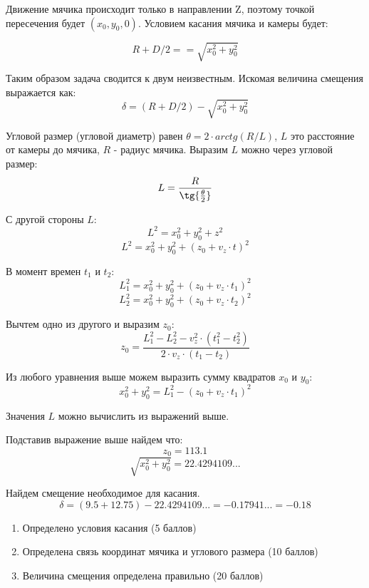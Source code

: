 \solutionSection
Движение мячика происходит только в направлении Z, поэтому точкой пересечения будет $(x_0, y_0, 0)$.  Условием касания мячика и камеры будет:

\[R + D/2 == \sqrt{x_0^2 + y_0^2} \]

Таким образом задача сводится к двум неизвестным. Искомая величина смещения выражается как:
\[\delta = (R + D/2) - \sqrt{x_0^2 + y_0^2}\]

Угловой размер (угловой диаметр) равен $\theta = 2 \cdot arctg(R/L)$, $L$ это расстояние  от камеры до мячика, $R$ - радиус мячика. Выразим $L$ можно через угловой размер:
\[ L = \frac{R}{\tg{\frac{\theta}{2}}} \]

С другой стороны $L$:
\[L^2 = x_0^2 + y_0^2 + z^2 \]
\[L^2 = x_0^2 + y_0^2 + (z_0 + v_z \cdot t)^2 \]

В момент времен $t_1$ и $t_2$:
\[L_1^2 = x_0^2 + y_0^2 + (z_0 + v_z \cdot t_1)^2 \]
\[L_2^2 = x_0^2 + y_0^2 + (z_0 + v_z \cdot t_2)^2 \]

Вычтем одно из другого и выразим $z_0$:
\[ z_0 = \frac{L_1^2 - L_2^2 - v_z^2  \cdot  (t_1^2 - t_2^2)}{2 \cdot v_z \cdot (t_1 - t_2)} \]

Из любого уравнения выше можем выразить сумму квадратов $x_0$ и $y_0$:
\[x_0^2 + y_0^2 = L_1^2 - (z_0 + v_z \cdot t_1)^2 \]

Значения $L$ можно вычислить из выражений выше.

Подставив выражение выше найдем что:
\[ z_0 =  113.1\]
\[ \sqrt{x_0^2 + y_0^2} =  22.4294109 ...\]

Найдем смещение необходимое для касания.
\[ \delta = (9.5 + 12.75) - 22.4294109 ... = -0.17941 ... = -0.18\]


\markSection

\begin{enumerate}
    \item Определено условия касания (5 баллов)
    \item Определена связь координат мячика и углового размера (10 баллов) 
    \item Величина смещения определена правильно (20 баллов)
\end{enumerate}